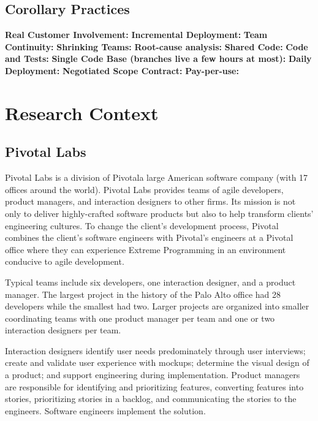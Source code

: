 \section{Corollary Practices}
\textbf{Real Customer Involvement:}
\textbf{Incremental Deployment:}
\textbf{Team Continuity:}
\textbf{Shrinking Teams:}
\textbf{Root-cause analysis:}
\textbf{Shared Code:}
\textbf{Code and Tests:}
\textbf{Single Code Base (branches live a few hours at most):}
\textbf{Daily Deployment:}
\textbf{Negotiated Scope Contract:}
\textbf{Pay-per-use:}




















\chapter{Research Context}
\label{ResearchContextChapter}


\section{Pivotal Labs}
Pivotal Labs is a division of Pivotal\textemdash a large American software company (with 17 offices around the world). Pivotal Labs provides teams of agile developers, product managers, and interaction designers to other firms. Its mission is not only to deliver highly-crafted software products but also to help transform clients' engineering cultures. To change the client's development process, Pivotal combines the client's software engineers with Pivotal's engineers at a Pivotal office where they can experience Extreme Programming \cite{BeckExtremeProgramming2004} in an environment conducive to agile development. 


Typical teams include six developers, one interaction designer, and a product manager. The largest project in the history of the Palo Alto office had 28 developers while the smallest had two. Larger projects are organized into smaller coordinating teams with one product manager per team and one or two interaction designers per team.


Interaction designers identify user needs predominately through user interviews; create and validate user experience with mockups; determine the visual design of a product; and support engineering during implementation. Product managers are responsible for identifying and prioritizing features, converting features into stories, prioritizing stories in a backlog, and communicating the stories to the engineers. Software engineers implement the solution. 


